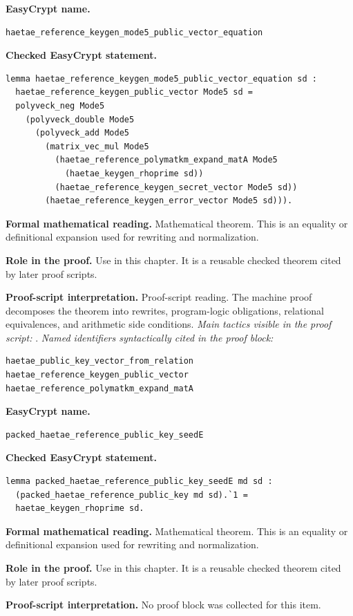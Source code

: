 \begin{formaltheorem}
\noindent\textbf{EasyCrypt name.}
\begin{lstlisting}[language=EasyCrypt,basicstyle=\ttfamily\scriptsize]
haetae_reference_keygen_mode5_public_vector_equation
\end{lstlisting}
\noindent\textbf{Checked EasyCrypt statement.}
\begin{lstlisting}[language=EasyCrypt,basicstyle=\ttfamily\scriptsize]
lemma haetae_reference_keygen_mode5_public_vector_equation sd :
  haetae_reference_keygen_public_vector Mode5 sd =
  polyveck_neg Mode5
    (polyveck_double Mode5
      (polyveck_add Mode5
        (matrix_vec_mul Mode5
          (haetae_reference_polymatkm_expand_matA Mode5
            (haetae_keygen_rhoprime sd))
          (haetae_reference_keygen_secret_vector Mode5 sd))
        (haetae_reference_keygen_error_vector Mode5 sd))).
\end{lstlisting}
\noindent\textbf{Formal mathematical reading.}
Mathematical theorem. This is an equality or definitional expansion used for rewriting and normalization.

\noindent\textbf{Role in the proof.}
Use in this chapter. It is a reusable checked theorem cited by later proof scripts.

\noindent\textbf{Proof-script interpretation.}
Proof-script reading. The machine proof decomposes the theorem into rewrites, program-logic obligations, relational equivalences, and arithmetic side conditions.
\emph{Main tactics visible in the proof script:} .
\emph{Named identifiers syntactically cited in the proof block:}
\begin{lstlisting}[language=EasyCrypt,basicstyle=\ttfamily\scriptsize]
haetae_public_key_vector_from_relation
haetae_reference_keygen_public_vector
haetae_reference_polymatkm_expand_matA
\end{lstlisting}

\end{formaltheorem}

\begin{formaltheorem}
\noindent\textbf{EasyCrypt name.}
\begin{lstlisting}[language=EasyCrypt,basicstyle=\ttfamily\scriptsize]
packed_haetae_reference_public_key_seedE
\end{lstlisting}
\noindent\textbf{Checked EasyCrypt statement.}
\begin{lstlisting}[language=EasyCrypt,basicstyle=\ttfamily\scriptsize]
lemma packed_haetae_reference_public_key_seedE md sd :
  (packed_haetae_reference_public_key md sd).`1 =
  haetae_keygen_rhoprime sd.
\end{lstlisting}
\noindent\textbf{Formal mathematical reading.}
Mathematical theorem. This is an equality or definitional expansion used for rewriting and normalization.

\noindent\textbf{Role in the proof.}
Use in this chapter. It is a reusable checked theorem cited by later proof scripts.

\noindent\textbf{Proof-script interpretation.}
No proof block was collected for this item.

\end{formaltheorem}

